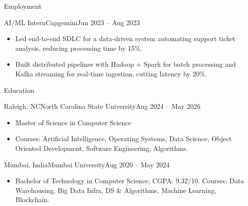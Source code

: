 \documentclass[]{mcdowellcv}
\begin{document}
\begin{cvsection}{Employment}
  \begin{cvsubsection}{AI/ML Intern}{Capgemini}{Jun 2023 -- Aug 2023}
    \begin{itemize}
      \item Led end-to-end SDLC for a data-driven system automating support ticket analysis, reducing processing time by 15\%.
      \item Built distributed pipelines with Hadoop + Spark for batch processing and Kafka streaming for real-time ingestion, cutting latency by 20\%.
    \end{itemize}
    \vspace{-1.5pt}
  \end{cvsubsection}
\end{cvsection}

\begin{cvsection}{Education}
  \begin{cvsubsection}{Raleigh, NC}{North Carolina State University}{Aug 2024 -- May 2026}
    \begin{itemize}
      \item Master of Science in Computer Science
      \item Courses: Artificial Intelligence, Operating Systems, Data Science, Object Oriented Development, Software Engineering, Algorithms.
    \end{itemize}
    \vspace{-1.5pt}
  \end{cvsubsection}

  \begin{cvsubsection}{Mumbai, India}{Mumbai University}{Aug 2020 -- May 2024}
    \begin{itemize}
      \item Bachelor of Technology in Computer Science; CGPA: 9.32/10. Courses: Data Warehousing, Big Data Infra, DS \& Algorithms, Machine Learning, Blockchain.
    \end{itemize}
    \vspace{-1.5pt}
  \end{cvsubsection}
\end{cvsection}
\end{document}
